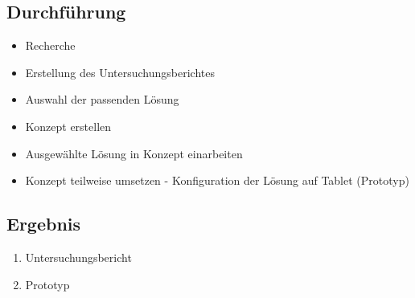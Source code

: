 \subsection{Durchführung}
\begin{itemize}
	\item Recherche
	\item Erstellung des Untersuchungsberichtes
	\item Auswahl der passenden Lösung
	\item Konzept erstellen
	\item Ausgewählte Lösung in Konzept einarbeiten
	\item Konzept teilweise umsetzen - Konfiguration der Lösung auf Tablet (Prototyp)
\end{itemize}
\subsection{Ergebnis}
\begin{enumerate}
	\item Untersuchungsbericht
	\item Prototyp
\end{enumerate}

